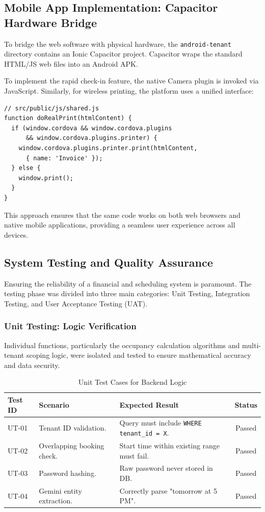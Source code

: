 \subsection{Mobile App Implementation: Capacitor Hardware Bridge}
To bridge the web software with physical hardware, the \texttt{android-tenant} directory contains an Ionic Capacitor project. Capacitor wraps the standard HTML/JS web files into an Android APK.

To implement the rapid check-in feature, the native Camera plugin is invoked via JavaScript. Similarly, for wireless printing, the platform uses a unified interface:
\begin{verbatim}
// src/public/js/shared.js
function doRealPrint(htmlContent) {
  if (window.cordova && window.cordova.plugins 
      && window.cordova.plugins.printer) {
    window.cordova.plugins.printer.print(htmlContent, 
      { name: 'Invoice' });
  } else {
    window.print();
  }
}
\end{verbatim}
This approach ensures that the same code works on both web browsers and native mobile applications, providing a seamless user experience across all devices.

\subsection{System Testing and Quality Assurance}
Ensuring the reliability of a financial and scheduling system is paramount. The testing phase was divided into three main categories: Unit Testing, Integration Testing, and User Acceptance Testing (UAT).

\subsubsection{Unit Testing: Logic Verification}
Individual functions, particularly the occupancy calculation algorithms and multi-tenant scoping logic, were isolated and tested to ensure mathematical accuracy and data security.

\begin{table}[htbp]
\centering
\begin{tabularx}{\textwidth}{|l|X|X|c|}
\hline
\rowcolor{LightCyan}
\textbf{Test ID} & \textbf{Scenario} & \textbf{Expected Result} & \textbf{Status} \\ \hline
UT-01 & Tenant ID validation. & Query must include \texttt{WHERE tenant\_id = X}. & Passed \\ \hline
UT-02 & Overlapping booking check. & Start time within existing range must fail. & Passed \\ \hline
UT-03 & Password hashing. & Raw password never stored in DB. & Passed \\ \hline
UT-04 & Gemini entity extraction. & Correctly parse "tomorrow at 5 PM". & Passed \\ \hline
\end{tabularx}
\caption{Unit Test Cases for Backend Logic}
\end{table}


